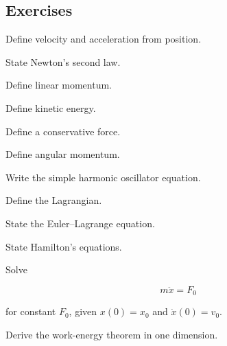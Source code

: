 \subsection{Exercises}
\label{subsec:mathematical-physics-exercises}

\begin{exercise}[1]
Define velocity and acceleration from position.
\end{exercise}

\begin{exercise}[1]
State Newton's second law.
\end{exercise}

\begin{exercise}[1]
Define linear momentum.
\end{exercise}

\begin{exercise}[1]
Define kinetic energy.
\end{exercise}

\begin{exercise}[1]
Define a conservative force.
\end{exercise}

\begin{exercise}[1]
Define angular momentum.
\end{exercise}

\begin{exercise}[1]
Write the simple harmonic oscillator equation.
\end{exercise}

\begin{exercise}[1]
Define the Lagrangian.
\end{exercise}

\begin{exercise}[1]
State the Euler--Lagrange equation.
\end{exercise}

\begin{exercise}[1]
State Hamilton's equations.
\end{exercise}

\begin{exercise}[2]
Solve

\[
m\ddot{x}=F_0
\]

for constant \(F_0\), given \(x(0)=x_0\) and \(\dot{x}(0)=v_0\).
\end{exercise}

\begin{exercise}[2]
Derive the work-energy theorem in one dimension.
\end{exercise}

